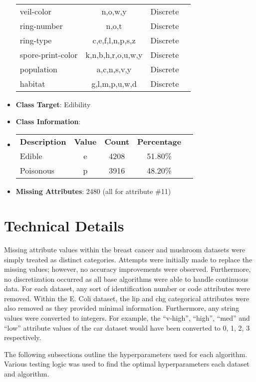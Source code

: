 \documentclass[11pt,titlepage]{article}
\newcommand{\bb}{\textbf}
\begin{document}
\begin{itemize}[leftmargin=*]
\begin{tabular}{l c c c }
    veil-color               & n,o,w,y                 & Discrete  \\
    ring-number              & n,o,t                   & Discrete  \\
    ring-type                & c,e,f,l,n,p,s,z         & Discrete  \\
    spore-print-color        & k,n,b,h,r,o,u,w,y       & Discrete  \\
    population               & a,c,n,s,v,y             & Discrete  \\
    habitat                  & g,l,m,p,u,w,d           & Discrete
  \end{tabular}
  \item[] \bb{Class Target}: Edibility
  \item[] \bb{Class Information}:
  \item[]
  \begin{tabular}{l c c c c }
    \bb{Description} & \bb{Value} & \bb{Count} & \bb{Percentage} \\
    Edible           & e          & 4208       & 51.80\%        \\
    Poisonous        & p          & 3916       & 48.20\%
  \end{tabular}
  \item[] \bb{Missing Attributes}: 2480 (all for attribute \#11)
\end{itemize}

\section{Technical Details} \label{sec:details}
Missing attribute values within the breast cancer and mushroom datasets were simply treated as distinct categories. Attempts were initially made to replace the missing values; however, no accuracy improvements were observed. Furthermore, no discretization occurred as all base algorithms were able to handle continuous data. For each dataset, any sort of identification number or code attributes were removed. Within the E. Coli dataset, the lip and chg categorical attributes were also removed as they provided minimal information. Furthermore, any string values were converted to integers. For example, the ``v-high'', ``high'', ``med'' and ``low'' attribute values of the car dataset would have been converted to 0, 1, 2, 3 respectively.

The following subsections outline the hyperparameters used for each algorithm. Various testing logic was used to find the optimal hyperparameters each dataset and algorithm.
\end{document}
